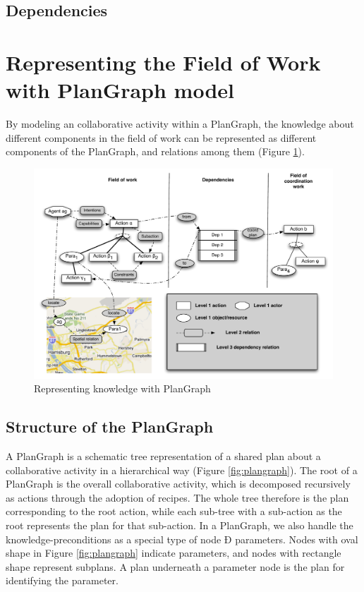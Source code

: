 
\subsection{Dependencies} %
\label{sub:dependencies}



\section{Representing the Field of Work with PlanGraph model} %
\label{sec:representing_the_field_of_work}
By modeling an collaborative activity within a PlanGraph, the knowledge about different components in the field of work can be represented as different components of the PlanGraph, and relations among them (Figure \ref{fig:knowledge_repre}).

\begin{figure}[htbp] %
   \centering
   \includegraphics[width=5.5in]{knowledge_repre.pdf} 
   \caption{Representing knowledge with PlanGraph}
   \label{fig:knowledge_repre}
\end{figure}

\subsection{Structure of the PlanGraph}

A PlanGraph is a schematic tree representation of a shared plan about a collaborative activity in a hierarchical way (Figure \ref{fig:plangraph}). The root of a PlanGraph is the overall collaborative activity, which is decomposed recursively as actions through the adoption of recipes. The whole tree therefore is the plan corresponding to the root action, while each sub-tree with a sub-action as the root represents the plan for that sub-action. In a PlanGraph, we also handle the knowledge-preconditions as a special type of node Ð parameters. Nodes with oval shape in Figure \ref{fig:plangraph} indicate parameters, and nodes with rectangle shape represent subplans. A plan underneath a parameter node is the plan for identifying the parameter. 

